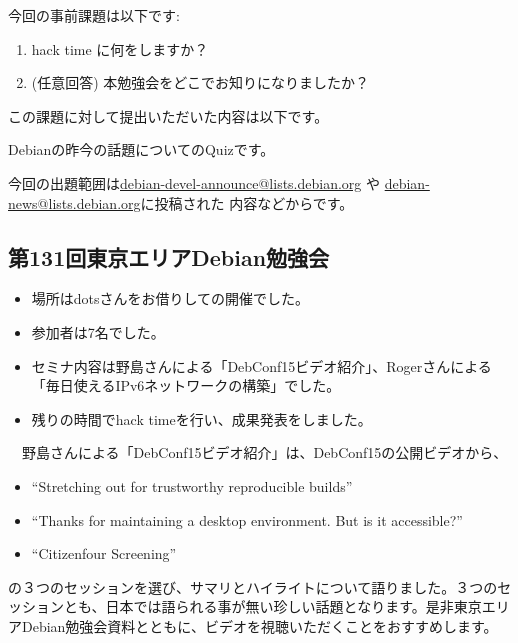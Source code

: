 \documentclass[mingoth,a4paper]{jsarticle}
\begin{document}

今回の事前課題は以下です:
\begin{enumerate}
\item hack time に何をしますか？
\item (任意回答) 本勉強会をどこでお知りになりましたか？
\end{enumerate}
この課題に対して提出いただいた内容は以下です。
\begin{multicols}{2}
{\small

}
\end{multicols}



Debianの昨今の話題についてのQuizです。

今回の出題範囲は\url{debian-devel-announce@lists.debian.org} や \url{debian-news@lists.debian.org}に投稿された
内容などからです。

\begin{multicols}{2}

\end{multicols}


\subsection{第131回東京エリアDebian勉強会}

\begin{itemize}
\item 場所はdotsさんをお借りしての開催でした。
\item 参加者は7名でした。
\item セミナ内容は野島さんによる「DebConf15ビデオ紹介」、Rogerさんによる「毎日使えるIPv6ネットワークの構築」でした。
\item 残りの時間でhack timeを行い、成果発表をしました。
\end{itemize} 

　野島さんによる「DebConf15ビデオ紹介」は、DebConf15の公開ビデオから、
\begin{itemize}
  \item ``Stretching out for trustworthy reproducible builds''
  \item ``Thanks for maintaining a desktop environment. But is it accessible?''
  \item ``Citizenfour Screening''
\end{itemize}
の３つのセッションを選び、サマリとハイライトについて語りました。３つのセッションとも、日本では語られる事が無い珍しい話題となります。是非東京エリアDebian勉強会資料とともに、ビデオを視聴いただくことをおすすめします。
\end{document}
